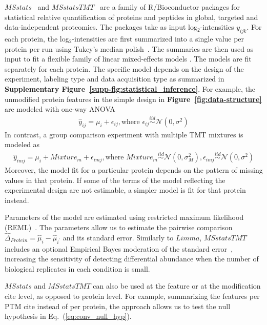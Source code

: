 \documentclass[mcp]{article}
\numberwithin{table}{section}
\def\eqref#1{Eq.~(\ref{eq:#1})}
\def\figref#1{{\bf Figure~\ref{fig:#1}}}
\begin{document}
$MSstats$~\cite{Choi:2014} and $MSstatsTMT$~\cite{Huang:2020} are a family of R/Bioconductor packages for statistical relative quantification of proteins and peptides in global, targeted and data-independent proteomics. The packages take as input log$_2$-intensities $y_{ijk}$. For each protein, the log$_2$-intensities are first summarized into a single value per protein per run using Tukey's median polish~\cite{Tukey:1977}. The summaries are then used as input to fit a flexible family of linear mixed-effects models \cite{McLean:1991, Faraway:2006, Bolker2009}. The models are fit separately for each protein. The specific model depends on the design of the experiment, labeling type and data acquisition type as summarized in {\bf Supplementary Figure~\ref{supp-fig:statistical_inference}}. For example, the unmodified protein features in the simple design in \figref{data-structure} are modeled with one-way ANOVA
\begin{eqnarray}
\hat{y}_{ij} = \mu_i + \epsilon_{ij}, \text{where } \epsilon_{ij} \stackrel{iid}{\sim} \mathcal{N}(0, \sigma^2)
\label{eq:msstats_model}
\end{eqnarray}
In contrast, a group comparison experiment with multiple TMT mixtures is modeled as
\begin{eqnarray}
\hat{y}_{imj} = \mu_i + Mixture_m + \epsilon_{imj}, \text{where } Mixture_m \stackrel{iid}{\sim} \mathcal{N}(0, \sigma_M^2), \epsilon_{imj} \stackrel{iid}{\sim} \mathcal{N}(0, \sigma^2)
\label{eq:msstatstmt_model}
\end{eqnarray}
Moreover, the model fit for a particular protein depends on the pattern of missing values in that protein. If some of the terms of the model reflecting the experimental design are not estimable, a simpler model is fit for that protein instead.

Parameters of the model are estimated using restricted maximum likelihood (REML)~\cite{Kenward}.
The parameters allow us to estimate the pairwise comparison $\hat{\Delta}_{Protein} = \hat{\mu}_{i} - \hat{\mu}_{i^{\prime}}$ and its standard error. Similarly to $Limma$, $MSstatsTMT$ includes an optional Empirical Bayes moderation of the standard error~\cite{Huang:2020},  increasing the sensitivity of detecting differential abundance when the number of biological replicates in each condition is small. 

$MSstats$ and $MSstatsTMT$ can  also be used at the feature or at the modification cite level, as opposed to protein level. For example, summarizing the features per PTM cite instead of per protein, the approach allows us to test the null hypothesis in \eqref{conv_null_hyp}.
\end{document}
